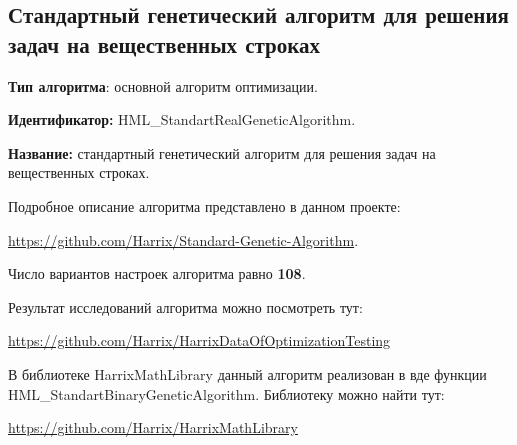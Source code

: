 \subsection{Стандартный генетический алгоритм для решения задач на вещественных строках}\label{HarrixOptimizationAlgorithms:HML_StandartRealGeneticAlgorithm}

\textbf{Тип алгоритма}: основной алгоритм оптимизации.

\textbf{Идентификатор:} HML\_StandartRealGeneticAlgorithm.

\textbf{Название:} стандартный генетический алгоритм для решения задач на вещественных строках.

Подробное описание алгоритма представлено в данном проекте:

\href{https://github.com/Harrix/Standard-Genetic-Algorithm}{https://github.com/Harrix/Standard-Genetic-Algorithm}. 

Число вариантов настроек алгоритма равно \textbf{108}.

Результат исследований алгоритма можно посмотреть тут:

\href{https://github.com/Harrix/HarrixDataOfOptimizationTesting}{https://github.com/Harrix/HarrixDataOfOptimizationTesting}

В библиотеке HarrixMathLibrary данный алгоритм реализован в вде функции HML\_StandartBinaryGeneticAlgorithm. Библиотеку можно найти тут:

\href{https://github.com/Harrix/HarrixMathLibrary}{https://github.com/Harrix/HarrixMathLibrary}